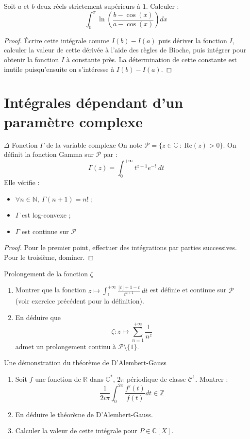 \documentclass[french,a4paper]{article}
\newcommand{\N}{\mathbb{N}}
\newcommand{\Z}{\mathbb{Z}}
\newcommand{\R}{\mathbb{R}}
\newcommand{\C}{\mathbb{C}}
\newcommand{\st}{^*}
\theoremstyle{plain}
\theoremstyle{definition}
\theoremstyle{remark}
\begin{document}
\begin{ex}[Lafitte]{}
	Soit $a$ et $b$ deux réels strictement supérieurs à $1$. Calculer : $$\int_{0}^{\pi}\ln\left(\frac{b-\cos(x)}{a-\cos(x)}\right)dx$$
\end{ex}
\begin{proof}
	Écrire cette intégrale comme $I(b)-I(a)$ puis dériver la fonction $I$, calculer la valeur de cette dérivée à l'aide des règles de Bioche, puis intégrer pour obtenir la fonction $I$ à constante près. La détermination de cette constante est inutile puisqu'ensuite on s'intéresse à $I(b)-I(a)$.
\end{proof}

\section{Intégrales dépendant d'un paramètre complexe}
\begin{ex}[Moulin.IP.31]{$\Delta$ Fonction $\Gamma$ de la variable complexe}
	On note $\mathcal{P}=\{z\in\C\ : \ \text{Re}(z)>0\}$. On définit la fonction Gamma sur $\mathcal{P}$ par : $$\Gamma(z)=\int_{0}^{+\infty}t^{z-1}e^{-t}\ dt$$ Elle vérifie : 
	\begin{itemize}
		\item $\forall n\in\N,\ \Gamma(n+1)=n!$ ;
		\item $\Gamma$ est log-convexe ;
		\item $\Gamma$ est continue sur $\mathcal{P}$
	\end{itemize}
\end{ex}
\begin{proof}
	Pour le premier point, effectuer des intégrations par parties successives. Pour le troisième, dominer.
\end{proof}

\begin{ex}[Moulin.IP.32]{Prolongement de la fonction $\zeta$}
	\begin{enumerate}
		\item Montrer que la fonction $z\mapsto\displaystyle\int_{1}^{+\infty}\frac{\lfloor t\rfloor+1-t}{t^{z+1}}\ dt$ est définie et continue sur $\mathcal{P}$ (voir exercice précédent pour la définition).
		\item En déduire que $$\zeta:z\mapsto\sum_{n=1}^{+\infty}\frac{1}{n^z}$$ admet un prolongement continu à $\mathcal{P}\setminus\{1\}$.
	\end{enumerate}
\end{ex}

\begin{ex}[Guindy]{Une démonstration du théorème de D'Alembert-Gauss}
	\begin{enumerate}
		\item Soit $f$ une fonction de $\R$ dans $\C\st$, $2\pi$-périodique de classe $\mathcal{C}^1$. Montrer : $$\frac{1}{2i\pi}\int_{0}^{2\pi}\frac{f'(t)}{f(t)}dt\in\Z$$
		\item En déduire le théorème de D'Alembert-Gauss.
		\item Calculer la valeur de cette intégrale pour $P\in\C[X]$.
	\end{enumerate}
\end{ex}
\end{document}
